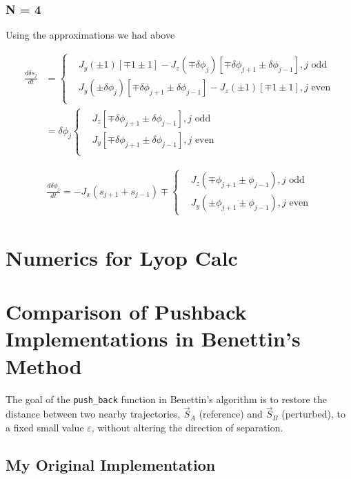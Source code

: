 \documentclass{article}
\begin{document}
\subsubsection{N = 4}

Using the approximations we had above

\begin{align*}
    \frac{d\delta s_j}{dt} &= \begin{cases}
        &J_y(\pm1)[\mp1 \pm 1] - J_z(\mp\delta\phi_j)[\mp\delta\phi_{j+1} \pm \delta\phi_{j-1}], j \text{ odd} \\
        &J_y(\pm\delta\phi_j)[\mp\delta\phi_{j+1} \pm \delta\phi_{j-1}] - J_z(\pm1)[\mp1 \pm 1], j \text{ even} \\
    \end{cases} \\
    &= \delta\phi_j\begin{cases}
        &J_z[\mp\delta\phi_{j+1} \pm \delta\phi_{j-1}], j \text{ odd} \\
        &J_y[\mp\delta\phi_{j+1} \pm \delta\phi_{j-1}], j \text{ even} \\
    \end{cases}
\end{align*}

\begin{align*}
    \frac{d\delta\phi_j}{dt} = -J_x(s_{j+1} + s_{j-1}) \mp \begin{cases}
        &J_z(\mp\phi_{j+1} \pm\phi_{j-1}), j \text{ odd} \\
        &J_y(\pm \phi_{j+1} \pm\phi_{j-1}), j \text{ even}
    \end{cases}
\end{align*}

\section{Numerics for Lyop Calc}
\section*{Comparison of Pushback Implementations in Benettin's Method}

The goal of the \texttt{push\_back} function in Benettin's algorithm is to restore the distance between two nearby trajectories, $\vec{S}_A$ (reference) and $\vec{S}_B$ (perturbed), to a fixed small value $\varepsilon$, without altering the direction of separation.

\subsection*{My Original Implementation}
\end{document}
